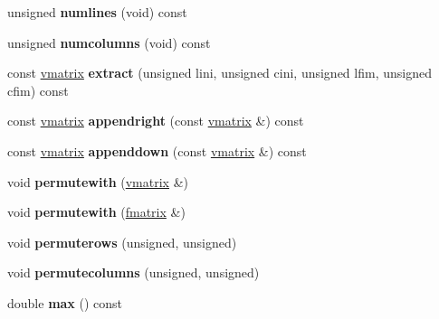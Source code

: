 \begin{DoxyCompactItemize}
\item 
unsigned {\bfseries numlines} (void) const \hypertarget{classvmatrix_a3676856f110d403f8ad8efb2fa87e556}{}\label{classvmatrix_a3676856f110d403f8ad8efb2fa87e556}

\item 
unsigned {\bfseries numcolumns} (void) const \hypertarget{classvmatrix_a2a406069400bfd44a95f22fcd14c0e30}{}\label{classvmatrix_a2a406069400bfd44a95f22fcd14c0e30}

\item 
const \hyperlink{classvmatrix}{vmatrix} {\bfseries extract} (unsigned lini, unsigned cini, unsigned lfim, unsigned cfim) const \hypertarget{classvmatrix_a981fab25ad6a67a5db402c5d0e7975de}{}\label{classvmatrix_a981fab25ad6a67a5db402c5d0e7975de}

\item 
const \hyperlink{classvmatrix}{vmatrix} {\bfseries appendright} (const \hyperlink{classvmatrix}{vmatrix} \&) const \hypertarget{classvmatrix_a269ca4d4231dde841e03cd8e1593ece2}{}\label{classvmatrix_a269ca4d4231dde841e03cd8e1593ece2}

\item 
const \hyperlink{classvmatrix}{vmatrix} {\bfseries appenddown} (const \hyperlink{classvmatrix}{vmatrix} \&) const \hypertarget{classvmatrix_a479730aeb97be751175e358d66848ca0}{}\label{classvmatrix_a479730aeb97be751175e358d66848ca0}

\item 
void {\bfseries permutewith} (\hyperlink{classvmatrix}{vmatrix} \&)\hypertarget{classvmatrix_afbce7450d0d4ebe800f884ca99284de2}{}\label{classvmatrix_afbce7450d0d4ebe800f884ca99284de2}

\item 
void {\bfseries permutewith} (\hyperlink{classfmatrix}{fmatrix} \&)\hypertarget{classvmatrix_aa79043d86676b09e3fdcaea903951710}{}\label{classvmatrix_aa79043d86676b09e3fdcaea903951710}

\item 
void {\bfseries permuterows} (unsigned, unsigned)\hypertarget{classvmatrix_ab242284ecd504aa795bad063a650f766}{}\label{classvmatrix_ab242284ecd504aa795bad063a650f766}

\item 
void {\bfseries permutecolumns} (unsigned, unsigned)\hypertarget{classvmatrix_a09ce53b6db86460b87a71a8ac62dce7e}{}\label{classvmatrix_a09ce53b6db86460b87a71a8ac62dce7e}

\item 
double {\bfseries max} () const \hypertarget{classvmatrix_aad0dcc22712531c6a26fc95e3b25b497}{}\label{classvmatrix_aad0dcc22712531c6a26fc95e3b25b497}


\end{DoxyCompactItemize}

